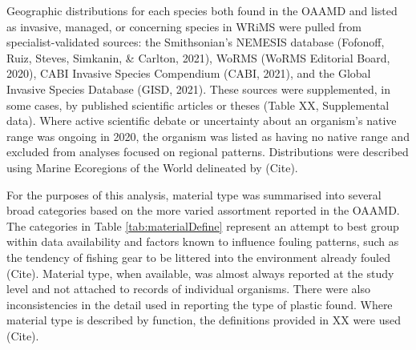 \documentclass[a4paper, nobind]{templates/ociamthesis}
\begin{document}
Geographic distributions for each species both found in the OAAMD and listed as invasive, managed, or concerning species in WRiMS were pulled from specialist-validated sources: the Smithsonian's NEMESIS database (Fofonoff, Ruiz, Steves, Simkanin, \& Carlton, 2021), WoRMS (WoRMS Editorial Board, 2020), CABI Invasive Species Compendium (CABI, 2021), and the Global Invasive Species Database (GISD, 2021). These sources were supplemented, in some cases, by published scientific articles or theses (Table XX, Supplemental data). Where active scientific debate or uncertainty about an organism's native range was ongoing in 2020, the organism was listed as having no native range and excluded from analyses focused on regional patterns. Distributions were described using Marine Ecoregions of the World delineated by (Cite).

For the purposes of this analysis, material type was summarised into several broad categories based on the more varied assortment reported in the OAAMD. The categories in Table \ref{tab:materialDefine} represent an attempt to best group within data availability and factors known to influence fouling patterns, such as the tendency of fishing gear to be littered into the environment already fouled (Cite). Material type, when available, was almost always reported at the study level and not attached to records of individual organisms. There were also inconsistencies in the detail used in reporting the type of plastic found. Where material type is described by function, the definitions provided in XX were used (Cite).

\begin{table}

\caption{\label{tab:materialDefine}Material type designations used to classify the broader range of materials found in the OAAMD to provide adequate sample sizes in the following statistical analyses.}
\centering
{}
\end{table}
\end{document}
